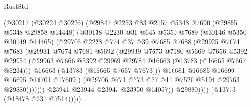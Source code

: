 \begin{lexlean}{RustStd}
\begin{coremodule}
                          (@30217
                            (@30224 @30226)
                            (@29847
                              @2253
                              @83
                              @2157
                              @5348
                              @7690
                              (@29855 @5348 @29858 @14448)
                              (@30138
                                @2230
                                @31
                                @645
                                @5350
                                @7689
                                (@30146 @5350 @30149 @14465)
                                (@29706
                                  @2228
                                  @774
                                  @37
                                  @39
                                  @7685
                                  @7688
                                  (@29925
                                    @7674
                                    @7683
                                    (@29931
                                      @7674
                                      @7681
                                      @5692
                                      (@29939
                                        @7673
                                        @7680
                                        @5669
                                        @7656
                                        @5392
                                        @29954
                                        (@29963
                                          @7666
                                          @5392
                                          @29969
                                          @29784
                                          @16663
                                          (@13783 (@16665 @7667 @5234)))
                                        @16663
                                        (@13783 (@16665 @7657 @7673)))
                                      @16681
                                      @16685
                                      @16690
                                      @16695
                                      @16701
                                      @17609))
                                  (@29706 @771 @773 @37 @11 @7520 @5194 @29763 @29880)))))))
                      @23941
                      @23944
                      @23947
                      @23950
                      @14057))
                  @29880))))
          (@13773 (@18478 @331 @7514)))))

\end{coremodule}
\end{lexlean}
